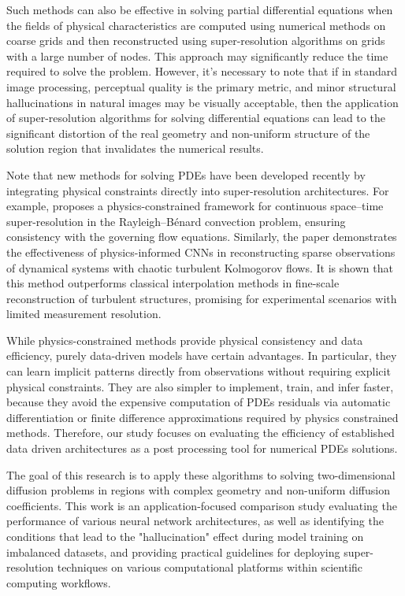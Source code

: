 \documentclass{ieeeaccess}
\begin{document}
Such methods can also be effective in solving partial differential equations when the fields of physical characteristics are computed using numerical methods on coarse grids and then reconstructed using super-resolution algorithms on grids with a large number of nodes. This approach may significantly reduce the time required to solve the problem. However, it's necessary to note that if in standard image processing, perceptual quality is the primary metric, and minor structural hallucinations in natural images may be visually acceptable, then the application of super-resolution algorithms for solving differential equations can lead to the significant distortion of the real geometry and non-uniform structure of the solution region that invalidates the numerical results.

Note that new methods for solving PDEs have been developed recently by integrating physical constraints directly into super-resolution architectures. For example, \cite{Jiang_PCSR} proposes a physics-constrained framework for continuous space–time super-resolution in  the Rayleigh–Bénard convection problem, ensuring consistency with the governing flow equations. Similarly,  the paper  \cite{Kelshaw_PCSR} demonstrates the effectiveness of physics-informed CNNs in reconstructing sparse observations of dynamical systems with chaotic turbulent Kolmogorov flows. It is shown that this method outperforms classical interpolation methods in fine-scale reconstruction of turbulent structures, promising for experimental scenarios with limited measurement resolution. 

While physics-constrained methods provide physical consistency and data efficiency, purely data-driven models have certain advantages. In particular, they can learn implicit patterns directly from observations without requiring explicit physical constraints. They are also simpler to implement, train, and infer faster, because they avoid the expensive computation of PDEs residuals via automatic differentiation or finite difference approximations required by physics constrained methods. Therefore, our study focuses on evaluating the efficiency of established data driven architectures as a post processing tool for numerical PDEs solutions.

The goal of this research is to apply these algorithms to solving two-dimensional diffusion problems in regions with complex geometry and non-uniform diffusion coefficients. This work is an application-focused comparison study evaluating the performance of various neural network architectures, as well as identifying the conditions that lead to the "hallucination" effect during model training on imbalanced datasets, and providing practical guidelines for deploying super-resolution techniques on various computational platforms within scientific computing workflows. 
\end{document}
